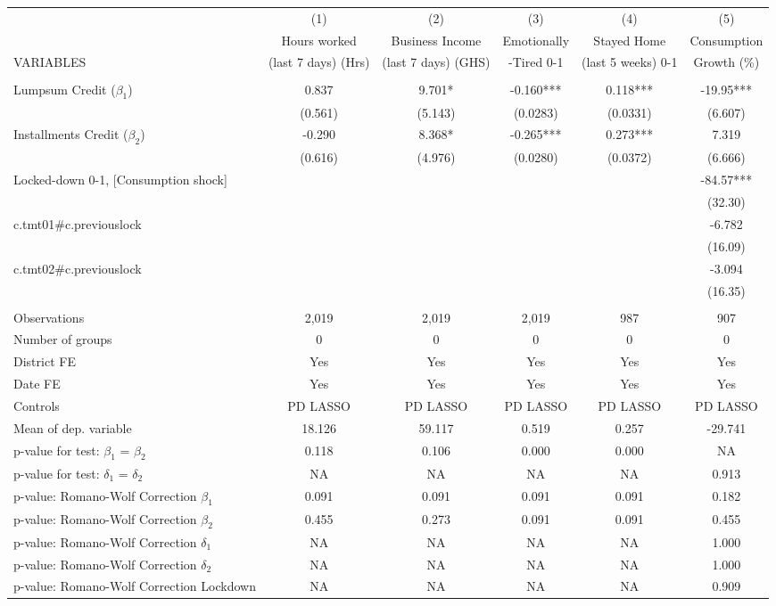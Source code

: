 \begin{tabular}{lccccc} \hline
 & (1) & (2) & (3) & (4) & (5) \\
 & Hours worked & Business Income & Emotionally & Stayed Home & Consumption \\
VARIABLES & (last 7 days) (Hrs) & (last 7 days) (GHS) & -Tired 0-1 & (last 5 weeks) 0-1 & Growth (\%) \\ \hline
 &  &  &  &  &  \\
Lumpsum Credit ($\beta_1$) & 0.837 & 9.701* & -0.160*** & 0.118*** & -19.95*** \\
 & (0.561) & (5.143) & (0.0283) & (0.0331) & (6.607) \\
Installments Credit ($\beta_2$) & -0.290 & 8.368* & -0.265*** & 0.273*** & 7.319 \\
 & (0.616) & (4.976) & (0.0280) & (0.0372) & (6.666) \\
Locked-down 0-1, [Consumption shock] &  &  &  &  & -84.57*** \\
 &  &  &  &  & (32.30) \\
c.tmt01\#c.previouslock &  &  &  &  & -6.782 \\
 &  &  &  &  & (16.09) \\
c.tmt02\#c.previouslock &  &  &  &  & -3.094 \\
 &  &  &  &  & (16.35) \\
 &  &  &  &  &  \\
Observations & 2,019 & 2,019 & 2,019 & 987 & 907 \\
Number of groups & 0 & 0 & 0 & 0 & 0 \\
District FE & Yes & Yes & Yes & Yes & Yes \\
Date FE & Yes & Yes & Yes & Yes & Yes \\
Controls & PD LASSO & PD LASSO & PD LASSO & PD LASSO & PD LASSO \\
Mean of dep. variable & 18.126 & 59.117 & 0.519 & 0.257 & -29.741 \\
p-value for test: $\beta_1$ = $\beta_2$ & 0.118 & 0.106 & 0.000 & 0.000 & NA \\
p-value for test: $\delta_1$ = $\delta_2$ & NA & NA & NA & NA & 0.913 \\
p-value: Romano-Wolf Correction $\beta_1$ & 0.091 & 0.091 & 0.091 & 0.091 & 0.182 \\
p-value: Romano-Wolf Correction $\beta_2$ & 0.455 & 0.273 & 0.091 & 0.091 & 0.455 \\
p-value: Romano-Wolf Correction $\delta_1$ & NA & NA & NA & NA & 1.000 \\
p-value: Romano-Wolf Correction $\delta_2$ & NA & NA & NA & NA & 1.000 \\
 p-value: Romano-Wolf Correction Lockdown & NA & NA & NA & NA & 0.909 \\ \hline
\end{tabular}
